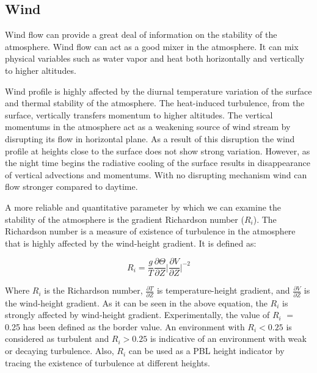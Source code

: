 \documentclass[a4paper,12pt]{article}
\numberwithin{equation}{section} %
\begin{document}
\subsection{Wind}

Wind flow can provide a great deal of information on the stability of the atmosphere. Wind flow can act as a good mixer in the atmosphere. It can mix physical variables such as water vapor and heat both horizontally and vertically to higher altitudes.

Wind profile is highly affected by the diurnal temperature variation of the surface and thermal stability of the atmosphere. The heat-induced turbulence, from the surface, vertically transfers momentum to higher altitudes. The vertical momentums in the atmosphere act as a weakening source of wind stream by disrupting its flow in horizontal plane. As a result of this disruption the wind profile at heights close to the surface does not show strong variation. However, as the night time begins the radiative cooling of the surface results in disappearance of vertical advections and momentums. With no disrupting mechanism wind can flow stronger compared to daytime.

A more reliable and quantitative parameter by which we can examine the stability of the atmosphere is the gradient Richardson number ($R_i$). The Richardson number is a measure of existence of turbulence in the atmosphere that is highly affected by the wind-height gradient. It is defined as:

\vspace{0.25cm}
\begin{equation}\label{ea:Ri}
R_i = \frac{g}{T}\frac{\partial\Theta}{\partial Z}\Big|\frac{\partial V}{\partial Z}\Big|^{-2}
\end{equation}
\vspace{0.25cm}

Where $R_i$ is the Richardson number, $\frac{\partial T}{\partial Z}$ is temperature-height gradient, and $\frac{\partial V}{\partial Z}$ is the wind-height gradient. As it can be seen in the above equation, the $R_i$ is strongly affected by wind-height gradient. Experimentally, the value of $R_i$ $=$ 0.25 has been defined as the border value. An environment with $R_i < 0.25$ is considered as turbulent and $R_i > 0.25$ is indicative of an environment with weak or decaying turbulence. Also, $R_i$ can be used as a PBL height indicator by tracing the existence of turbulence at different heights.

\newpage
\end{document}
